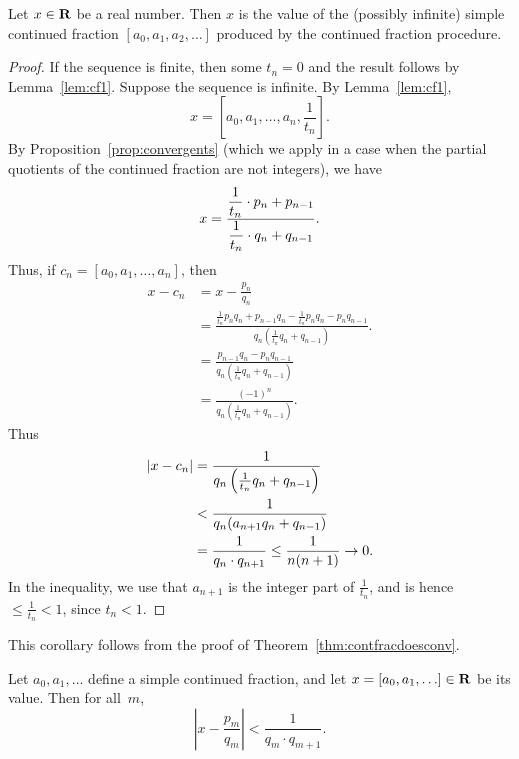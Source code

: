 \begin{theorem}\label{thm:contfracdoesconv}
Let $x\in\mathbf{R}$ be a real number.  Then $x$ is the value
of the (possibly infinite) simple continued fraction
$
  [a_0, a_1, a_2, \ldots]
$
produced by the continued fraction procedure.
\end{theorem}
\begin{proof}
If the sequence is finite, then some $t_n=0$ and the
result follows by Lemma~\ref{lem:cf1}.
Suppose the sequence is infinite.
By Lemma~\ref{lem:cf1},
$$
  x = [a_0, a_1, \ldots, a_n, \frac{1}{t_n}].
$$
By Proposition~\ref{prop:convergents} (which we apply in a case when
the partial quotients of the continued fraction are not integers),
we have
$$
  x = \frac{\displaystyle\frac{1}{t_n} \cdot p_n + p_{n-1}}{\displaystyle\frac{1}{t_n}\cdot q_n + q_{n-1}}.
$$
Thus, if $c_n = [a_0, a_1, \ldots, a_n]$, then
\begin{align*}
x - c_n &= x - \frac{p_n}{q_n}\\
      &=\frac{\frac{1}{t_n} p_n q_n + p_{n-1} q_n - \frac{1}{t_n} p_n q_n - p_n q_{n-1}}
        {q_n \left(\frac{1}{t_n} q_n + q_{n-1}\right)}.\\
      &= \frac{p_{n-1} q_n - p_{n}q_{n-1}}{q_n\left(\frac{1}{t_n} q_n + q_{n-1}\right)} \\
      &= \frac{(-1)^n}{q_n\left(\frac{1}{t_n} q_n + q_{n-1}\right)}.
\end{align*}
Thus
\begin{align*}
 |x - c_n| &= \frac{1}{q_n\left(\frac{1}{t_n} q_n + q_{n-1}\right)} \\
           &< \frac{1}{q_n(a_{n+1} q_n + q_{n-1})} \\
           &= \frac{1}{q_n \cdot q_{n+1}} \leq \frac{1}{n(n+1)} \rightarrow 0.
\end{align*}
In the inequality, we use that $a_{n+1}$ is the integer part of
$\frac{1}{t_n}$, and is hence $\leq \frac{1}{t_n}<1$, since $t_n<1$.
\end{proof}

This corollary follows from the proof of Theorem~\ref{thm:contfracdoesconv}.
\begin{corollary}\label{cor:cfconv}%
%
Let $a_0,a_1,\ldots$ define a simple continued
fraction, and let $x=[a_0,a_1,\ldots]\in\mathbf{R}$ be its value.
Then for all~$m$,
$$
  \left| x - \frac{p_m}{q_m}\right|
  < \frac{1}{q_m \cdot q_{m+1}}.
$$
\end{corollary}


